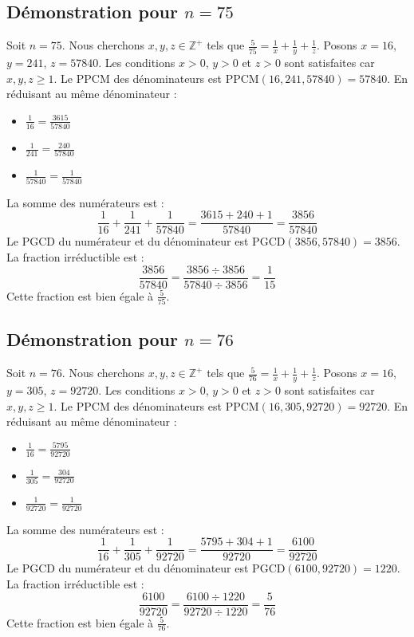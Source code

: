 \documentclass[11pt,a4paper]{article}
\begin{document}
\subsection{Démonstration pour $n = 75$}
Soit $n = 75$. Nous cherchons $x, y, z \in \mathbb{Z}^{+}$ tels que $\frac{5}{75} = \frac{1}{x} + \frac{1}{y} + \frac{1}{z}$.
Posons $x = 16$, $y = 241$, $z = 57840$.
Les conditions $x > 0$, $y > 0$ et $z > 0$ sont satisfaites car $x, y, z \geq 1$.
Le PPCM des dénominateurs est $\text{PPCM}(16, 241, 57840) = 57840$.
En réduisant au même dénominateur :
\begin{itemize}
    \item $\frac{1}{16} = \frac{3615}{57840}$
    \item $\frac{1}{241} = \frac{240}{57840}$
    \item $\frac{1}{57840} = \frac{1}{57840}$
\end{itemize}
La somme des numérateurs est :
$$ \frac{1}{16} + \frac{1}{241} + \frac{1}{57840} = \frac{3615 + 240 + 1}{57840} = \frac{3856}{57840} $$
Le PGCD du numérateur et du dénominateur est $\text{PGCD}(3856, 57840) = 3856$.
La fraction irréductible est :
$$ \frac{3856}{57840} = \frac{3856 \div 3856}{57840 \div 3856} = \frac{1}{15} $$
Cette fraction est bien égale à $\frac{5}{75}$.

\subsection{Démonstration pour $n = 76$}
Soit $n = 76$. Nous cherchons $x, y, z \in \mathbb{Z}^{+}$ tels que $\frac{5}{76} = \frac{1}{x} + \frac{1}{y} + \frac{1}{z}$.
Posons $x = 16$, $y = 305$, $z = 92720$.
Les conditions $x > 0$, $y > 0$ et $z > 0$ sont satisfaites car $x, y, z \geq 1$.
Le PPCM des dénominateurs est $\text{PPCM}(16, 305, 92720) = 92720$.
En réduisant au même dénominateur :
\begin{itemize}
    \item $\frac{1}{16} = \frac{5795}{92720}$
    \item $\frac{1}{305} = \frac{304}{92720}$
    \item $\frac{1}{92720} = \frac{1}{92720}$
\end{itemize}
La somme des numérateurs est :
$$ \frac{1}{16} + \frac{1}{305} + \frac{1}{92720} = \frac{5795 + 304 + 1}{92720} = \frac{6100}{92720} $$
Le PGCD du numérateur et du dénominateur est $\text{PGCD}(6100, 92720) = 1220$.
La fraction irréductible est :
$$ \frac{6100}{92720} = \frac{6100 \div 1220}{92720 \div 1220} = \frac{5}{76} $$
Cette fraction est bien égale à $\frac{5}{76}$.
\end{document}
